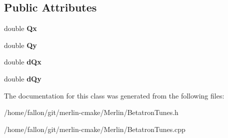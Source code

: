 \subsection*{Public Attributes}
\begin{DoxyCompactItemize}
\item 
\mbox{\label{classBetatronTunes_ac5541a59b692a1b274fdfec9022d9724}} 
double {\bfseries Qx}
\item 
\mbox{\label{classBetatronTunes_adcf9a0108432de1f4c81748b05113246}} 
double {\bfseries Qy}
\item 
\mbox{\label{classBetatronTunes_afafa35c6bca3035b4c0f0f26124f511b}} 
double {\bfseries d\+Qx}
\item 
\mbox{\label{classBetatronTunes_a4f2beb84e770a6831072d66f10eae690}} 
double {\bfseries d\+Qy}
\end{DoxyCompactItemize}


The documentation for this class was generated from the following files\+:\begin{DoxyCompactItemize}
\item 
/home/fallon/git/merlin-\/cmake/\+Merlin/Betatron\+Tunes.\+h\item 
/home/fallon/git/merlin-\/cmake/\+Merlin/Betatron\+Tunes.\+cpp\end{DoxyCompactItemize}
